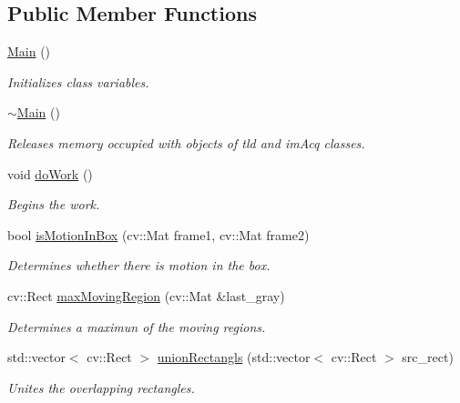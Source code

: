 \subsection*{Public Member Functions}
\begin{DoxyCompactItemize}
\item 
\hyperlink{classMain_a50d4361a1b613205467a441b5c40c199}{Main} ()
\begin{DoxyCompactList}\small\item\em Initializes class variables. \end{DoxyCompactList}\item 
\hyperlink{classMain_a58d9c0798f0d2114e736d04d780a080f}{$\sim$\-Main} ()
\begin{DoxyCompactList}\small\item\em Releases memory occupied with objects of tld and im\-Acq classes. \end{DoxyCompactList}\item 
void \hyperlink{classMain_a5effa58c6ae671f8ce4ff31cb6e07aa5}{do\-Work} ()
\begin{DoxyCompactList}\small\item\em Begins the work. \end{DoxyCompactList}\item 
bool \hyperlink{classMain_a1be636e85ee5221937fca1d29f344842}{is\-Motion\-In\-Box} (cv\-::\-Mat frame1, cv\-::\-Mat frame2)
\begin{DoxyCompactList}\small\item\em Determines whether there is motion in the box. \end{DoxyCompactList}\item 
cv\-::\-Rect \hyperlink{classMain_a1eb1fa4005a0235d28035ec4c02ebd80}{max\-Moving\-Region} (cv\-::\-Mat \&last\-\_\-gray)
\begin{DoxyCompactList}\small\item\em Determines a maximun of the moving regions. \end{DoxyCompactList}\item 
std\-::vector$<$ cv\-::\-Rect $>$ \hyperlink{classMain_a5d36ac4bd55c63eae9b37d194a6017ce}{union\-Rectangls} (std\-::vector$<$ cv\-::\-Rect $>$ src\-\_\-rect)
\begin{DoxyCompactList}\small\item\em Unites the overlapping rectangles. \end{DoxyCompactList}\end{DoxyCompactItemize}

